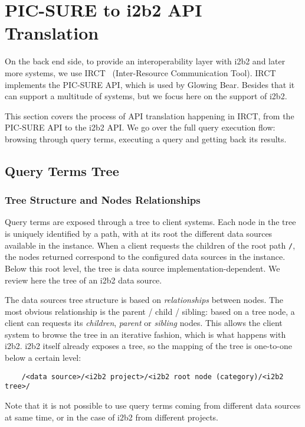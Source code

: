 \section{PIC-SURE to i2b2 API Translation}
\label{sec:interoplayer-picsure}

On the back end side, to provide an interoperability layer with i2b2 and later more systems, we use IRCT~\cite{github:IRCT} (Inter-Resource Communication Tool).
IRCT implements the PIC-SURE API, which is used by Glowing Bear.
Besides that it can support a multitude of systems, but we focus here on the support of i2b2.

This section covers the process of API translation happening in IRCT, from the PIC-SURE API to the i2b2 API.
We go over the full query execution flow: browsing through query terms, executing a query and getting back its results.


\subsection{Query Terms Tree}

\subsubsection{Tree Structure and Nodes Relationships}

Query terms are exposed through a tree to client systems.
Each node in the tree is uniquely identified by a path, with at its root the different data sources available in the instance.
When a client requests the children of the root path \verb|/|, the nodes returned correspond to the configured data sources in the instance.
Below this root level, the tree is data source implementation-dependent.
We review here the tree of an i2b2 data source.

The data sources tree structure is based on \emph{relationships} between nodes.
The most obvious relationship is the parent / child / sibling: based on a tree node, a client can requests its \emph{children}, \emph{parent} or \emph{sibling} nodes.
This allows the client system to browse the tree in an iterative fashion, which is what happens with i2b2.
i2b2 itself already exposes a tree, so the mapping of the tree is one-to-one below a certain level:
\begin{verbatim}
    /<data source>/<i2b2 project>/<i2b2 root node (category)/<i2b2 tree>/
\end{verbatim}
Note that it is not possible to use query terms coming from different data sources at same time, or in the case of i2b2 from different projects.

